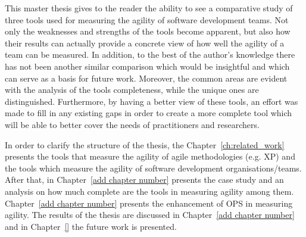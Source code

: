 This master thesis gives to the reader the ability to see a comparative study of three tools used for measuring the agility of software development teams. Not only the weaknesses and strengths of the tools become apparent, but also how their results can actually provide a concrete view of how well the agility of a team can be measured. In addition, to the best of the author's knowledge there has not been another similar comparison which would be insightful and which can serve as a basis for future work. Moreover, the common areas are evident with the analysis of the tools completeness, while the unique ones are distinguished. Furthermore, by having a better view of these tools, an effort was made to fill in any existing gaps in order to create a more complete tool which will be able to better cover the needs of practitioners and researchers.

In order to clarify the structure of the thesis, the Chapter~\ref{ch:related_work} presents the tools that measure the agility of agile methodologies (e.g. XP) and the tools which measure the agility of software development organisations/teams. After that, in Chapter~\ref{add chapter number} presents the case study and an analysis on how much complete are the tools in measuring agility among them. Chapter~\ref{add chapter number} presents the enhancement of OPS in measuring agility. The results of the thesis are discussed in Chapter~\ref{add chapter number} and in Chapter~\ref{} the future work is presented. 




